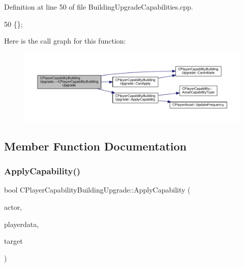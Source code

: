 Definition at line 50 of file Building\+Upgrade\+Capabilities.\+cpp.


\begin{DoxyCode}
50 \{\};
\end{DoxyCode}
Here is the call graph for this function\+:
\nopagebreak
\begin{figure}[H]
\begin{center}
\leavevmode
\includegraphics[width=350pt]{classCPlayerCapabilityBuildingUpgrade_abcef586e377c86c3da3cd698dca268ef_cgraph}
\end{center}
\end{figure}


\subsection{Member Function Documentation}
\hypertarget{classCPlayerCapabilityBuildingUpgrade_a5e71446b74307f31ce6d6e9bbfd9a681}{}\label{classCPlayerCapabilityBuildingUpgrade_a5e71446b74307f31ce6d6e9bbfd9a681} 
\subsubsection{\texorpdfstring{Apply\+Capability()}{ApplyCapability()}}
{\footnotesize\ttfamily bool C\+Player\+Capability\+Building\+Upgrade\+::\+Apply\+Capability (\begin{DoxyParamCaption}\item[{std\+::shared\+\_\+ptr$<$ \hyperlink{classCPlayerAsset}{C\+Player\+Asset} $>$}]{actor,  }\item[{std\+::shared\+\_\+ptr$<$ \hyperlink{classCPlayerData}{C\+Player\+Data} $>$}]{playerdata,  }\item[{std\+::shared\+\_\+ptr$<$ \hyperlink{classCPlayerAsset}{C\+Player\+Asset} $>$}]{target }\end{DoxyParamCaption})\hspace{0.3cm}{\ttfamily [virtual]}}



